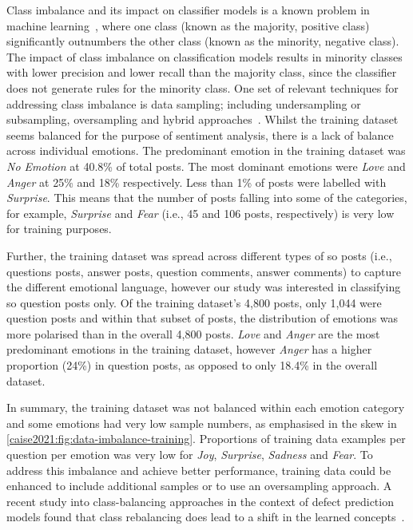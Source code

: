 Class imbalance and its impact on classifier models is a known problem in machine learning~\citep{Lopez2014, Weiss2004}, where  one class (known as the majority, positive class) significantly outnumbers the other class (known as the minority, negative class).  The impact of class imbalance on classification models results in minority classes with lower precision and lower recall than the majority class, since the classifier does not generate rules for the minority class.  One set of relevant techniques for addressing class imbalance is data sampling; including undersampling or subsampling, oversampling and hybrid approaches~\citep{Lopez2014}.
Whilst the training dataset seems balanced for the purpose of sentiment analysis, there is a lack of balance across individual emotions.  The predominant emotion in the training dataset was \textit{No Emotion} at 40.8\% of total posts. The most dominant emotions were \textit{Love} and \textit{Anger} at 25\% and 18\% respectively.  Less than 1\% of posts were labelled with \textit{Surprise}.  This means that the number of posts falling into some of the categories, for example, \textit{Surprise} and \textit{Fear} (i.e., 45 and 106 posts, respectively) is very low for training purposes. 

Further, the training dataset was spread across different types of \gls{so} posts (i.e., questions posts, answer posts, question comments, answer comments) to capture the different emotional language, however our study was interested in classifying \gls{so} question posts only. Of the training dataset's 4,800 posts, only 1,044 were question posts and within that subset of posts, the distribution of emotions was more polarised than in the overall 4,800 posts. \textit{Love} and \textit{Anger} are the most predominant emotions in the training dataset, however \textit{Anger} has a higher proportion (24\%) in question posts, as opposed to only 18.4\% in the overall dataset. 

In summary, the training dataset was not balanced within each emotion category and some emotions had very low sample numbers, as emphasised in the skew in \cref{caise2021:fig:data-imbalance-training}.  Proportions of training data examples per question per emotion was very low for \textit{Joy}, \textit{Surprise}, \textit{Sadness} and \textit{Fear}.
To address this imbalance and achieve better performance, training data could be enhanced to include additional samples or to use an oversampling approach.  A recent study into class-balancing approaches in the context of defect prediction models found that class rebalancing does lead to a shift in the learned concepts~\citep{Turhan2012OnModels}.

